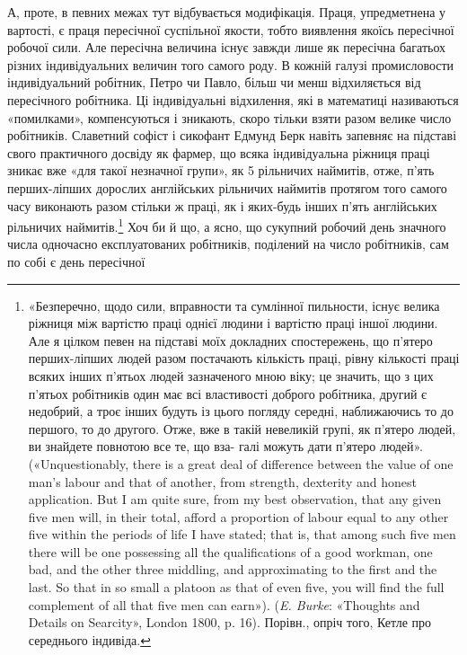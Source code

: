 А, проте, в певних межах тут відбувається модифікація. Праця,
упредметнена у вартості, є праця пересічної суспільної якости,
тобто виявлення якоїсь пересічної робочої сили. Але пересічна
величина існує завжди лише як пересічна багатьох різних індивідуальних
величин того самого роду. В кожній галузі промисловости
індивідуальний робітник, Петро чи Павло, більш чи менш
відхиляється від пересічного робітника. Ці індивідуальні відхилення,
які в математиці називаються «помилками», компенсуються
і зникають, скоро тільки взяти разом велике число робітників.
Славетний софіст і сикофант Едмунд Берк навіть запевняє
на підставі свого практичного досвіду як фармер, що всяка індивідуальна
ріжниця праці зникає вже «для такої незначної групи»,
як 5 рільничих наймитів, отже, п’ять перших-ліпших дорослих
англійських рільничих наймитів протягом того самого часу виконають
разом стільки ж праці, як і яких-будь інших п’ять англійських
рільничих наймитів.\footnote{
«Безперечно, щодо сили, вправности та сумлінної пильности, існує
велика ріжниця між вартістю праці однієї людини і вартістю праці іншої
людини. Але я цілком певен на підставі моїх докладних спостережень, що
п’ятеро перших-ліпших людей разом постачають кількість праці, рівну
кількості праці всяких інших п'ятьох людей зазначеного мною віку; це
значить, що з цих п’ятьох робітників один має всі властивості доброго
робітника, другий є недобрий, а троє інших будуть із цього погляду середні,
наближаючись то до першого, то до другого. Отже, вже в такій
невеликій групі, як п’ятеро людей, ви знайдете повнотою все те, що вза-
галі можуть дати п'ятеро людей». («Unquestionably, there is a great deal
of difference between the value of one man’s labour and that of another,
from strength, dexterity and honest application. But I am quite sure, from
my best observation, that any given five men will, in their total, afford a
proportion of labour equal to any other five within the periods of life I have
stated; that is, that among such five men there will be one possessing all
the qualifications of a good workman, one bad, and the other three middling,
and approximating to the first and the last. So that in so small a platoon
as that of even five, you will find the full complement of all that five men
can earn»). (\emph{E. Burke}: «Thoughts and Details on Searcity», London
1800, p. 16). Порівн., опріч того, Кетле про середнього індивіда.
} Хоч би й що, а ясно, що сукупний
робочий день значного числа одночасно експлуатованих робітників,
поділений на число робітників, сам по собі є день пересічної
